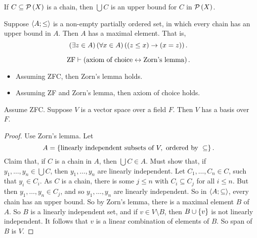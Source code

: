 \begin{example*}
If $ C \subseteq \mathcal{P}\left( X \right) $ is a chain, then $ \bigcup C $ is an upper bound for $ C $ in $ \mathcal{P}\left( X \right) $.
\end{example*}

\begin{definition}
Suppose $ \left\langle A; \le \right\rangle $ is a non-empty partially ordered set, in which every chain has an upper bound in $ A $. Then $ A $ has a maximal element. That is,
$$ \left( \exists z \in A \right)\left( \forall x \in A \right)\left( \left( z \le x \right) \rightarrow \left( x = z \right) \right). $$
\end{definition}

\begin{theorem}
\label{thm:4.3.2}
$$ \text{ZF} \vdash \left( \text{axiom of choice} \leftrightarrow \text{Zorn's lemma} \right). $$
\begin{itemize}
\item Assuming ZFC, then Zorn's lemma holds.
\item Assuming ZF and Zorn's lemma, then axiom of choice holds.
\end{itemize}
\end{theorem}

\begin{example}
Assume ZFC. Suppose $ V $ is a vector space over a field $ F $. Then $ V $ has a basis over $ F $.
\end{example}

\begin{proof}
Use Zorn's lemma. Let
$$ A = \cb{\text{linearly independent subsets of} \ V, \ \text{ordered by} \ \subseteq}. $$
Claim that, if $ C $ is a chain in $ A $, then $ \bigcup C \in A $. Must show that, if $ y_1, \dots, y_n \in \bigcup C $, then $ y_1, \dots, y_n $ are linearly independent. Let $ C_1, \dots, C_n \in C $, such that $ y_i \in C_i $. As $ C $ is a chain, there is some $ j \le n $ with $ C_i \subseteq C_j $ for all $ i \le n $. But then $ y_1, \dots, y_n \in C_j $, and so $ y_1, \dots, y_n $ are linearly independent. So in $ \left\langle A; \subseteq \right\rangle $, every chain has an upper bound. So by Zorn's lemma, there is a maximal element $ B $ of $ A $. So $ B $ is a linearly independent set, and if $ v \in V \setminus B $, then $ B \cup \left\{ v \right\} $ is not linearly independent. It follows that $ v $ is a linear combination of elements of $ B $. So span of $ B $ is $ V $.
\end{proof}

